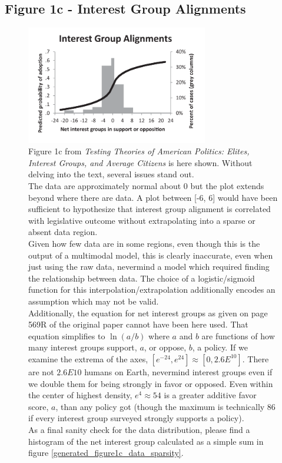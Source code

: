 \documentclass[]{article}
\begin{document}
\subsection{Figure 1c - Interest Group Alignments}
\begin{figure}[H]
	\begin{center}
		\includegraphics[width=300px]{./figures/paper/interest-group-preferences.png}
	\end{center}	
	\caption{Figure 1c from \textit{Testing Theories of American Politics: Elites, Interest Groups, and Average Citizens} is here shown. Without delving into the text, several issues stand out. \\The data are approximately normal about 0 but the plot extends beyond where there are data. A plot between [-6, 6] would have been sufficient to hypothesize that interest group alignment is correlated with legislative outcome without extrapolating into a sparse or absent data region. \\Given how few data are in some regions, even though this is the output of a multimodal model, this is clearly inaccurate, even when just using the raw data, nevermind a model which required finding the relationship between data. The choice of a logistic/sigmoid function for this interpolation/extrapolation additionally encodes an assumption which may not be valid. \\Additionally, the equation for net interest groups as given on page 569R of the original paper cannot have been here used. That equation simplifies to $\ln(a/b)$ where $a$ and $b$ are functions of how many interest groups support, $a$, or oppose, $b$, a policy. If we examine the extrema of the axes, $[e^{-24}, e^{24}] \approx [0, 2.6E^{10}]$. There are not $2.6E10$ humans on Earth, nevermind interest groups even if we double them for being strongly in favor or opposed. Even within the center of highest density, $e^{4} \approx 54$ is a greater additive favor score, $a$, than any policy got (though the maximum is technically 86 if every interest group surveyed strongly supports a policy).\\As a final sanity check for the data distribution, please find a histogram of the net interest group calculated as a simple sum in figure \ref{generated_figure1c_data_sparsity}.}
	\label{paper_figure1c}
\end{figure}
\end{document}
